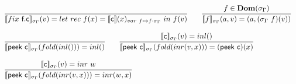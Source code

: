 \documentclass[a4paper,UKenglish,cleveref, autoref, thm-restate]{lipics-v2021}
\begin{document}
\begin{definition}[Interpretation]
\begin{displaymath}
\begin{array}{l}
\infer{\interp{\fix~\dslcom{f}.\dslcom{c}}_{\sigma_{\Gamma}}(v)=\rec{f}{x}{\interp{\dslcom{c}}(x)_{\mathsf{var~f} \mapsto f \cdot \sigma_{\Gamma}}}{f}(v)}{} \qquad
\infer{\interp{\mathsf{f}}_{\sigma_{\Gamma}}(a,v)=(a,(\sigma_{\Gamma}~\mathsf{f})(v))}{f \in \mathbf{Dom}(\sigma_{\Gamma})}
\\\\
\infer{\interpsig{peek c}{fold (inl ())}{inl ()}}{} \qquad
\infer{\interpsig{peek c}{fold (inr (v,x))}{(\dslcom{peek c})(x)}}{\interpsig{c}{v}{inl ()}}
\\\\
\infer{\interpsig{peek c}{fold (inr (v,x))}{inr (w,x)}}{\interpsig{c}{v}{inr~w}}
    \end{array}
  \end{displaymath}
\end{definition}
\end{document}
